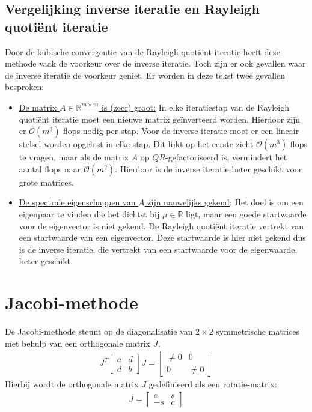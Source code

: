 \documentclass[a4paper, 12pt, titlepage, fleqn]{article}
\begin{document}
\subsection{Vergelijking inverse iteratie en Rayleigh quoti\"ent iteratie}
Door de kubische convergentie van de Rayleigh quoti\"ent iteratie heeft deze methode vaak de voorkeur over de inverse iteratie. Toch zijn er ook gevallen waar de inverse iteratie de voorkeur geniet. Er worden in deze tekst twee gevallen besproken:
\begin{itemize}
\item \underline{De matrix $A \in \mathbb{R}^{m\times m}$ is (zeer) groot:} In elke iteratiestap van de Rayleigh quoti\"ent iteratie moet een nieuwe matrix ge\"inverteerd worden. Hierdoor zijn er $\mathcal{O}(m^3)$ flops nodig per stap. Voor de inverse iteratie moet er een lineair stelsel worden opgelost in elke stap. Dit lijkt op het eerste zicht $\mathcal{O}(m^3)$ flops te vragen, maar als de matrix $A$ op $QR$-gefactoriseerd is, vermindert het aantal flops naar $\mathcal{O}(m^2)$. Hierdoor is de inverse iteratie beter geschikt voor grote matrices.
\item \underline{De spectrale eigenschappen van $A$ zijn nauwelijks gekend}: Het doel is om een eigenpaar te vinden die het dichtst bij $\mu \in \mathbb{R}$ ligt, maar een goede startwaarde voor de eigenvector is niet gekend. De Rayleigh quoti\"ent iteratie vertrekt van een startwaarde van een eigenvector. Deze startwaarde is hier niet gekend dus is de inverse iteratie, die vertrekt van een startwaarde voor de eigenwaarde, beter geschikt.
\end{itemize}

\section{Jacobi-methode}
De Jacobi-methode steunt op de diagonalisatie van $2 \times 2$ symmetrische matrices met behulp van een orthogonale matrix $J$,
\begin{align}\label{eq:jacobi}
J^T\left[\begin{matrix}
a &d\\
d &b
\end{matrix}\right]J = \left[ \begin{matrix}
\neq 0 &0\\
0 &\neq 0
\end{matrix}\right]
\end{align}
Hierbij wordt de orthogonale matrix $J$ gedefinieerd als een rotatie-matrix:
\begin{align}\label{eq:cs}
J  = \left[\begin{matrix}
c &s\\
-s &c
\end{matrix}\right]
\end{align}
\end{document}
